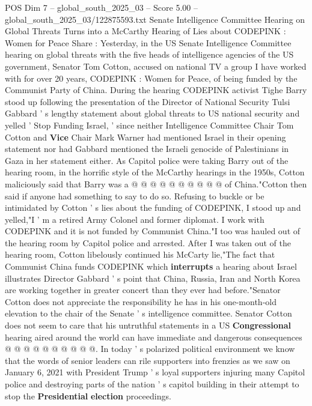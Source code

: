 \begin{textsample}{POS Dim 7 – global\_south\_2025\_03 – Score 5.00 – global\_south\_2025\_03/122875593.txt}  \label{ex:f7_pos_426}
Senate Intelligence Committee Hearing on Global Threats Turns into a McCarthy Hearing of Lies about CODEPINK : Women for Peace Share : Yesterday, in the US Senate Intelligence Committee hearing on global threats with the five heads of intelligence agencies of the US government, Senator Tom Cotton, accused on national TV a group I have worked with for over 20 years, CODEPINK : Women for Peace, of being funded by the Communist Party of China.
During the hearing CODEPINK activist Tighe Barry stood up following the presentation of the Director of National Security Tulsi Gabbard ' s lengthy statement about global threats to US national security and yelled ' Stop Funding Israel, ' since neither Intelligence Committee Chair Tom Cotton and \textbf{Vice} Chair Mark Warner had mentioned Israel in their opening statement nor had Gabbard mentioned the Israeli genocide of Palestinians in Gaza in her statement either.
As Capitol police were taking Barry out of the hearing room, in the horrific style of the McCarthy hearings in the 1950s, Cotton maliciously said that Barry was a @ @ @ @ @ @ @ @ @ @ of China."Cotton then said if anyone had something to say to do so.
Refusing to buckle or be intimidated by Cotton ' s lies about the funding of CODEPINK, I stood up and yelled,"I ' m a retired Army Colonel and former diplomat.
I work with CODEPINK and it is not funded by Communist China."I too was hauled out of the hearing room by Capitol police and arrested.
After I was taken out of the hearing room, Cotton libelously continued his McCarty lie,"The fact that Communist China funds CODEPINK which \textbf{interrupts} a hearing about Israel illustrates Director Gabbard ' s point that China, Russia, Iran and North Korea are working together in greater concert than they ever had before."Senator Cotton does not appreciate the responsibility he has in his one-month-old elevation to the chair of the Senate ' s intelligence committee.
Senator Cotton does not seem to care that his untruthful statements in a US \textbf{Congressional} hearing aired around the world can have immediate and dangerous consequences @ @ @ @ @ @ @ @ @ @.
In today ' s polarized political environment we know that the words of senior leaders can rile supporters into frenzies as we saw on January 6, 2021 with President Trump ' s loyal supporters injuring many Capitol police and destroying parts of the nation ' s capitol building in their attempt to stop the \textbf{Presidential} \textbf{election} proceedings.

\end{textsample}
